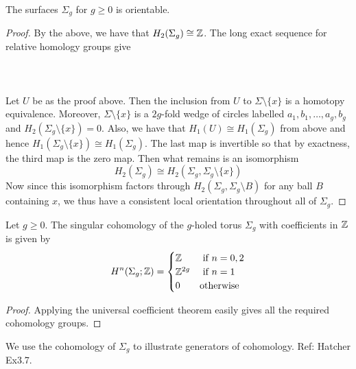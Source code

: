 \documentclass[a4paper]{article}
\begin{document}
\begin{crl}{}{} The surfaces $\Sigma_g$ for $g\geq 0$ is orientable. \tcbline
\begin{proof}
By the above, we have that $H_2(\Sigma_g)\cong\mathbb{Z}$. The long exact sequence for relative homology groups give \\~\\
\\~\\
Let $U$ be as the proof above. Then the inclusion from $U$ to $\Sigma\setminus\{x\}$ is a homotopy equivalence. Moreover, $\Sigma\setminus\{x\}$ is a $2g$-fold wedge of circles labelled $a_1,b_1,\dots,a_g,b_g$ and $H_2(\Sigma_g\setminus\{x\})=0$. Also, we have that $H_1(U)\cong H_1(\Sigma_g)$ from above and hence $H_1(\Sigma_g\setminus\{x\})\cong H_1(\Sigma_g)$. The last map is invertible so that by exactness, the third map is the zero map. Then what remains is an isomorphism $$H_2(\Sigma_g)\cong H_2(\Sigma_g,\Sigma_g\setminus\{x\})$$ Now since this isomorphism factors through $H_2(\Sigma_g,\Sigma_g\setminus B)$ for any ball $B$ containing $x$, we thus have a consistent local orientation throughout all of $\Sigma_g$. 
\end{proof}
\end{crl}

\begin{prp}{}{} Let $g\geq 0$. The singular cohomology of the $g$-holed torus $\Sigma_g$ with coefficients in $\mathbb{Z}$ is given by $$H^n(\Sigma_g;\mathbb{Z})=\begin{cases}
\mathbb{Z} & \text{ if } n=0,2\\
\mathbb{Z}^{2g} & \text{ if } n=1\\
0 & \text{otherwise}
\end{cases}$$ \tcbline
\begin{proof}
Applying the universal coefficient theorem easily gives all the required cohomology groups. 
\end{proof}
\end{prp}

We use the cohomology of $\Sigma_g$ to illustrate generators of cohomology. Ref: Hatcher Ex3.7. 
\end{document}
